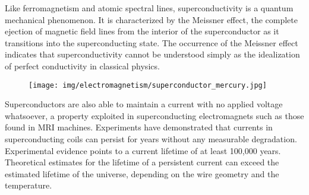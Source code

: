 	Like ferromagnetism and atomic spectral lines, superconductivity is a quantum mechanical phenomenon. It is characterized by the Meissner effect, the complete ejection of magnetic field lines from the interior of the superconductor as it transitions into the superconducting state. The occurrence of the Meissner effect indicates that superconductivity cannot be understood simply as the idealization of perfect conductivity in classical physics.
	\begin{figure}[H]
		\centering
		\texttt{[image: img/electromagnetism/superconductor\_mercury.jpg]}
	\end{figure}
	Superconductors are also able to maintain a current with no applied voltage whatsoever, a property exploited in superconducting electromagnets such as those found in MRI machines. Experiments have demonstrated that currents in superconducting coils can persist for years without any measurable degradation. Experimental evidence points to a current lifetime of at least 100,000 years. Theoretical estimates for the lifetime of a persistent current can exceed the estimated lifetime of the universe, depending on the wire geometry and the temperature.
	
